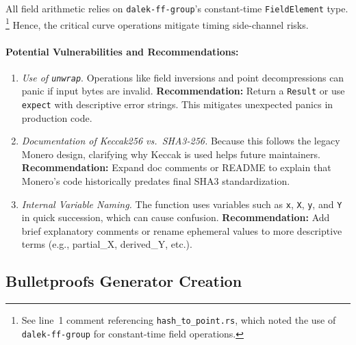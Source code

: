 \documentclass[12pt,a4paper]{article}
\begin{document}
All field arithmetic relies on \texttt{dalek-ff-group}’s constant-time \texttt{FieldElement} type.%
\footnote{See line~1 comment referencing \texttt{hash\_to\_point.rs}, which noted the use of \texttt{dalek-ff-group} for constant-time field operations.}
Hence, the critical curve operations mitigate timing side-channel risks.

\paragraph{Potential Vulnerabilities and Recommendations:}
\begin{enumerate}
    \item \emph{Use of \texttt{unwrap}}. 
    Operations like field inversions and point decompressions can panic if input bytes are invalid. 
    \textbf{Recommendation:} Return a \texttt{Result} or use \texttt{expect} with descriptive error strings. 
    This mitigates unexpected panics in production code.

    \item \emph{Documentation of Keccak256 vs.\ SHA3-256.} 
    Because this follows the legacy Monero design, clarifying why Keccak is used helps future maintainers. 
    \textbf{Recommendation:} Expand doc comments or README to explain that Monero’s code historically predates final SHA3 standardization.

    \item \emph{Internal Variable Naming.} 
    The function uses variables such as \texttt{x}, \texttt{X}, \texttt{y}, and \texttt{Y} in quick succession, which can cause confusion. 
    \textbf{Recommendation:} Add brief explanatory comments or rename ephemeral values to more descriptive terms (e.g., partial\_X, derived\_Y, etc.).
\end{enumerate}

\subsection{Bulletproofs Generator Creation}
\end{document}
